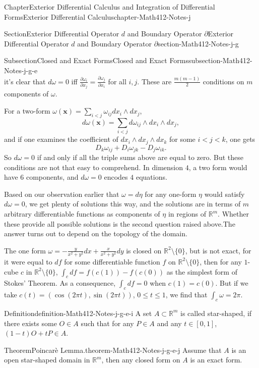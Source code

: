 \documentclass[oneside,10pt,]{book}
\numberwithin{equation}{section}
\newcommand{\bx}{\mathbf{x}}
\newcommand{\bbR}{\mathbb{R}}
\begin{document}
\begin{chapterptx}{Chapter}{Exterior Differential Calculus and Integration of Differential Forms}{}{Exterior Differential Calculus}{}{}{chapter-Math412-Notes-j}
\begin{sectionptx}{Section}{Exterior Differential Operator \(d\) and Boundary Operator \(\partial\)}{}{Exterior Differential Operator \(d\) and Boundary Operator \(\partial\)}{}{}{section-Math412-Notes-j-g}
\begin{subsectionptx}{Subsection}{Closed and Exact Forms}{}{Closed and Exact Forms}{}{}{subsection-Math412-Notes-j-g-e}
\begin{equation*}
\end{equation*}
it's clear that \(d\omega=0\) iff \(\frac{\partial \omega_{i}}{\partial x_j} = \frac{\partial \omega_{j}}{\partial x_{i}}\) for all \(i, j\). These are \(\frac{m(m-1)}{2}\) conditions on \(m\) components of \(\omega\).%
\par
For a two-form \(\omega(\bx)=\sum_{i < j} \omega_{ij} dx_{i}\wedge dx_{j}\),%
\begin{equation*}
d\omega(\bx)=\sum_{i < j}d \omega_{ij} \wedge dx_{i}\wedge dx_{j},
\end{equation*}
and if one examines the coefficient of \(dx_{i}\wedge dx_{j}\wedge dx_{k}\) for some \(i < j < k\), one gets%
\begin{equation*}
D_{k} \omega_{ij} + D_{i} \omega_{jk}-D_{j}\omega_{ik}.
\end{equation*}
So \(d\omega=0\) if and only if all the triple sums above are equal to zero. But these conditions are not that easy to comprehend. In dimension \(4\), a two form would have \(6\) components, and \(d\omega=0\) encodes \(4\) equations.%
\par
Based on our observation earlier that \(\omega=d\eta\) for any one-form \(\eta\) would satisfy \(d\omega=0\), we get plenty of solutions this way, and the solutions are in terms of \(m\) arbitrary differentiable functions as components of \(\eta\) in regions of \(\bbR^{m}\). Whether these provide all possible solutions is the second question raised above.The answer turns out to depend on the topology of the domain.%
\par
The one form \(\omega=-\frac{y}{x^{2}+y^{2}}dx + \frac{x}{x^{2}+y^{2}} dy\) is closed on \(\bbR^{2}\setminus\{0\}\), but is not exact, for it were equal to  \(df\) for some differentiable function \(f\) on \(\bbR^{2}\setminus\{0\}\), then for any \(1\)-cube \(c\) in  \(\bbR^{2}\setminus\{0\}\), \(\int_{c} df =f(c(1))-f(c(0))\) as the simplest form of Stokes' Theorem. As a consequence, \(\int_{c} df =0\) when \(c(1)=c(0)\). But if we take \(c(t)=(\cos (2\pi t), \sin (2\pi t))\), \(0\le t \le 1\), we find that \(\int_{c} \omega= 2\pi\).%
\begin{definition}{Definition}{}{definition-Math412-Notes-j-g-e-i}%
A set \(A\subset \bbR^{m}\) is called star-shaped, if there exists some \(O\in A\) such that for any \(P\in A\) and any \(t\in [0, 1]\), \((1-t)O+tP\in A\).\end{definition}
\begin{theorem}{Theorem}{Poincarè Lemma.}{}{theorem-Math412-Notes-j-g-e-j}%
Assume that \(A\) is an open star-shaped domain in \(\bbR^{m}\), then any closed form on \(A\) is an exact form.\end{theorem}

\end{subsectionptx}
\end{sectionptx}
\end{chapterptx}
\end{document}
